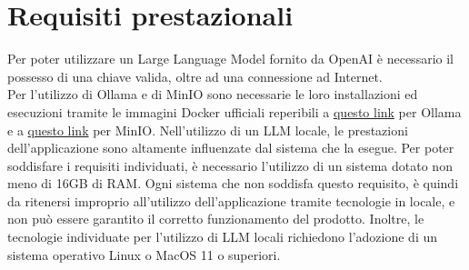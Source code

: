 \section{Requisiti prestazionali}
Per poter utilizzare un Large Language Model fornito da OpenAI è necessario il possesso di una chiave  valida, oltre ad una connessione ad Internet.\\
Per l'utilizzo di Ollama e di MinIO sono necessarie le loro installazioni ed esecuzioni tramite le immagini Docker ufficiali reperibili a \href{https://ollama.ai/blog/ollama-is-now-available-as-an-official-docker-image}{questo link} per Ollama e a \href{https://min.io/docs/minio/container/index.html}{questo link} per MinIO.
Nell'utilizzo di un LLM locale, le prestazioni dell'applicazione sono altamente influenzate dal sistema che la esegue. Per poter soddisfare i requisiti individuati, è necessario l'utilizzo di un sistema dotato non meno di 16GB di RAM. Ogni sistema che non soddisfa questo requisito, è quindi da ritenersi improprio all'utilizzo dell'applicazione tramite tecnologie in locale, e non può essere garantito il corretto funzionamento del prodotto. Inoltre, le tecnologie individuate per l'utilizzo di LLM locali richiedono l'adozione di un sistema operativo Linux o MacOS 11 o superiori.
   
   


